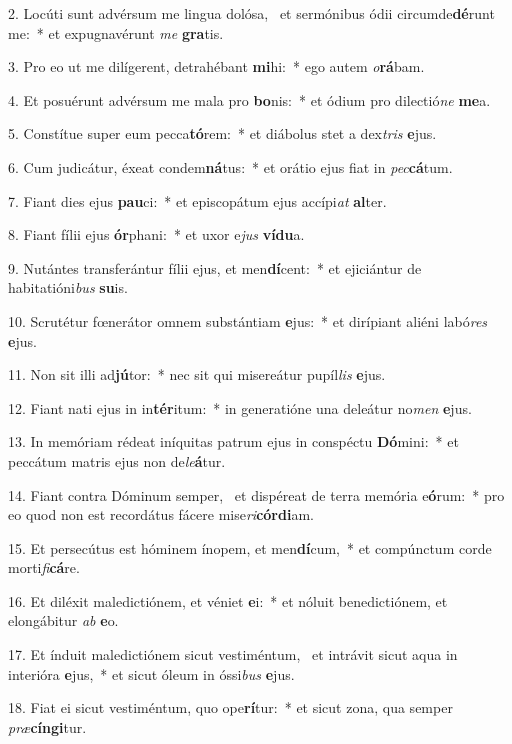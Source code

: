 2. Locúti sunt advérsum me lingua dolósa, \dag\  et sermónibus ódii circumde\textbf{dé}runt me:~*  et expugnavérunt \textit{me} \textbf{gra}tis.\

3. Pro eo ut me dilígerent, detrahébant \textbf{mi}hi:~*  ego autem \textit{o}\textbf{rá}bam.\

4. Et posuérunt advérsum me mala pro \textbf{bo}nis:~*  et ódium pro dilectió\textit{ne} \textbf{me}a.\

5. Constítue super eum pecca\textbf{tó}rem:~*  et diábolus stet a dex\textit{tris} \textbf{e}jus.\

6. Cum judicátur, éxeat condem\textbf{ná}tus:~*  et orátio ejus fiat in \textit{pec}\textbf{cá}tum.\

7. Fiant dies ejus \textbf{pau}ci:~*  et episcopátum ejus accípi\textit{at} \textbf{al}ter.\

8. Fiant fílii ejus \textbf{ór}phani:~*  et uxor e\textit{jus} \textbf{ví}\textbf{du}a.\

9. Nutántes transferántur fílii ejus, et men\textbf{dí}cent:~*  et ejiciántur de habitatióni\textit{bus} \textbf{su}is.\

10. Scrutétur fœnerátor omnem substántiam \textbf{e}jus:~*  et dirípiant aliéni labó\textit{res} \textbf{e}jus.\

11. Non sit illi ad\textbf{jú}tor:~*  nec sit qui misereátur pupíl\textit{lis} \textbf{e}jus.\

12. Fiant nati ejus in in\textbf{tér}itum:~*  in generatióne una deleátur no\textit{men} \textbf{e}jus.\

13. In memóriam rédeat iníquitas patrum ejus in conspéctu \textbf{Dó}mini:~*  et peccátum matris ejus non de\textit{le}\textbf{á}tur.\

14. Fiant contra Dóminum semper, \dag\  et dispéreat de terra memória e\textbf{ó}rum:~*  pro eo quod non est recordátus fácere mise\textit{ri}\textbf{cór}\textbf{di}am.\

15. Et persecútus est hóminem ínopem, et men\textbf{dí}cum,~*  et compúnctum corde morti\textit{fi}\textbf{cá}re.\

16. Et diléxit maledictiónem, et véniet \textbf{e}i:~*  et nóluit benedictiónem, et elongábitur \textit{ab} \textbf{e}o.\

17. Et índuit maledictiónem sicut vestiméntum, \dag\  et intrávit sicut aqua in interióra \textbf{e}jus,~*  et sicut óleum in óssi\textit{bus} \textbf{e}jus.\

18. Fiat ei sicut vestiméntum, quo ope\textbf{rí}tur:~*  et sicut zona, qua semper \textit{præ}\textbf{cín}\textbf{gi}tur.\

